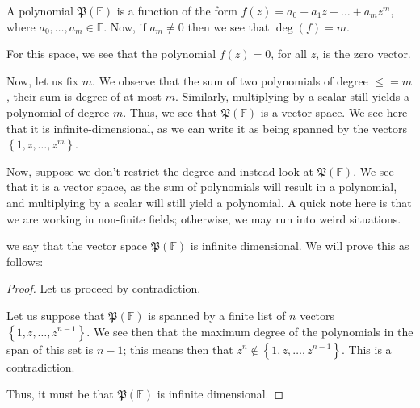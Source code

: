 \documentclass[openany]{book}
\begin{document}
	\begin{example}
		A polynomial $\mathfrak{P}(\mathbb{F})$ is a function of the form $f(z) = a_{0} + a_{1}z + \ldots + a_{m}z^{m}$, where $a_{0}, \ldots, a_{m} \in \mathbb{F}$. Now, if $a_{m} \not= 0$ then we see that $\deg (f) = m$.
		
		For this space, we see that the polynomial $f(z) = 0$, for all $z$, is the zero vector.
		
		Now, let us fix $m$. We observe that the sum of two polynomials of degree $\leq= m$, their sum is degree of at most $m$. Similarly, multiplying by a scalar still yields a polynomial of degree $m$. Thus, we see that $\mathfrak{P}(\mathbb{F})$ is a vector space. We see here that it is infinite-dimensional, as we can write it as being spanned by the vectors $\left\{  1, z, \ldots, z^{m}\right\}$.
		
		Now, suppose we don't restrict the degree and instead look at $\mathfrak{P}\left( \mathbb{F} \right)$. We see that it is a vector space, as the sum of polynomials will result in a polynomial, and multiplying by a scalar will still yield a polynomial. A quick note here is that we are working in non-finite fields; otherwise, we may run into weird situations.
		
		we say that the vector space $\mathfrak{P}(\mathbb{F})$ is infinite dimensional. We will prove this as follows:
		\begin{proof}
			Let us proceed by contradiction.
			
			Let us suppose that $\mathfrak{P}\left( \mathbb{F} \right)$ is spanned by a finite list of $n$ vectors $\left\{  1, z, \ldots, z^{n-1} \right\}$. We see then that the maximum degree of the polynomials in the span of this set is $n-1$; this means then that $z^{n} \not\in \left\{  1, z, \ldots, z^{n-1} \right\}$. This is a contradiction.
			
			Thus, it must be that $\mathfrak{P}(\mathbb{F})$ is infinite dimensional.
		\end{proof}
	\end{example}
	
\end{document}
